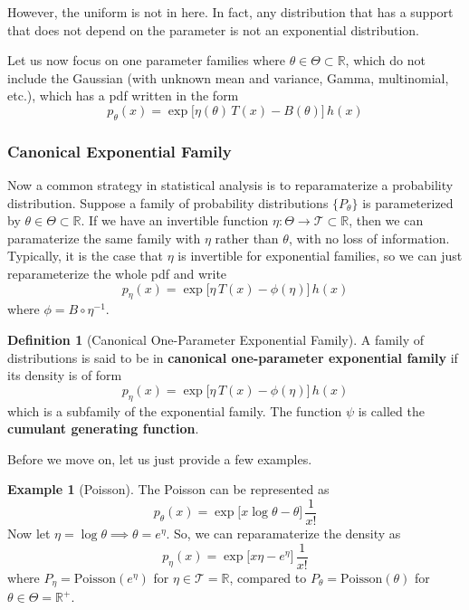 \documentclass{article}
\theoremstyle{definition}
\newtheorem{example}{Example}[section]
\newtheorem{definition}{Definition}[section]
\begin{document}
  However, the uniform is not in here. In fact, any distribution that has a support that does not depend on the parameter is not an exponential distribution. 

  Let us now focus on one parameter families where $\theta \in \Theta \subset \mathbb{R}$, which do not include the Gaussian (with unknown mean and variance, Gamma, multinomial, etc.), which has a pdf written in the form 
  \[p_\theta (x) = \exp \big[ \eta (\theta) \, T(x) - B(\theta) \big] \, h(x)\]


  \subsubsection{Canonical Exponential Family}

  Now a common strategy in statistical analysis is to reparamaterize a probability distribution. Suppose a family of probability distributions $\{P_\theta\}$ is parameterized by $\theta \in \Theta \subset \mathbb{R}$. If we have an invertible function $\eta: \Theta \rightarrow \mathcal{T} \subset \mathbb{R}$, then we can paramaterize the same family with $\eta$ rather than $\theta$, with no loss of information. Typically, it is the case that $\eta$ is invertible for exponential families, so we can just reparameterize the whole pdf and write 
  \[p_\eta (x) = \exp \big[ \eta \, T(x) - \phi(\eta) \big] \, h(x)\]
  where $\phi = B \circ \eta^{-1}$. 

  \begin{definition}[Canonical One-Parameter Exponential Family]
  A family of distributions is said to be in \textbf{canonical one-parameter exponential family} if its density is of form 
  \[p_\eta (x) = \exp \big[ \eta \, T(x) - \phi(\eta) \big] \, h(x)\]
  which is a subfamily of the exponential family. The function $\psi$ is called the \textbf{cumulant generating function}. 
  \end{definition}

  Before we move on, let us just provide a few examples. 

  \begin{example}[Poisson]
  The Poisson can be represented as 
  \[p_\theta (x) = \exp \big[ x \log{\theta} - \theta \big] \, \frac{1}{x!}\]
  Now let $\eta = \log{\theta} \implies \theta = e^{\eta}$. So, we can reparamaterize the density as 
  \[p_\eta(x) = \exp \big[ x \eta - e^\eta \big] \, \frac{1}{x!}\]
  where $P_\eta = \mathrm{Poisson}(e^\eta)$ for $\eta \in \mathcal{T} = \mathbb{R}$, compared to $P_\theta = \mathrm{Poisson}(\theta)$ for $\theta \in \Theta = \mathbb{R}^+$. 
  \end{example}
\end{document}
